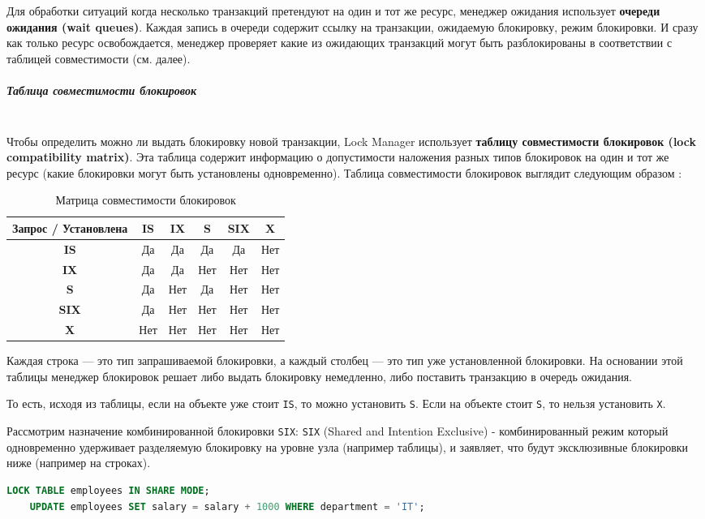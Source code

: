  Для обработки ситуаций когда несколько транзакций претендуют на один и тот же ресурс, менеджер ожидания использует \textbf{очереди ожидания (wait queues)}. Каждая запись в очереди содержит ссылку на транзакции, ожидаемую блокировку, режим блокировки. И сразу как только ресурс освобождается, менеджер проверяет какие из ожидающих транзакций могут быть разблокированы в соответствии с таблицей совместимости (см. далее).

\subparagraph{Таблица совместимости блокировок} ~\\

 Чтобы определить можно ли выдать блокировку новой транзакции, Lock Manager использует \textbf{таблицу совместимости блокировок (lock compatibility matrix)}. Эта таблица содержит информацию о допустимости наложения разных типов блокировок на один и тот же ресурс (какие блокировки могут быть установлены одновременно). Таблица совместимости блокировок выглядит следующим образом \autocite{Silberschatz}:
 
 \begin{table}[H]
    \centering
    \begin{tabular}{|c|c|c|c|c|c|}
        \hline
        \textbf{Запрос / Установлена} & \textbf{IS} & \textbf{IX} & \textbf{S} & \textbf{SIX} & \textbf{X} \\
        \hline
        \textbf{IS} & Да & Да & Да & Да & Нет \\
        \hline
        \textbf{IX} & Да & Да & Нет & Нет & Нет \\
        \hline
        \textbf{S} & Да & Нет & Да & Нет & Нет \\
        \hline
        \textbf{SIX} & Да & Нет & Нет & Нет & Нет \\
        \hline
        \textbf{X} & Нет & Нет & Нет & Нет & Нет \\
        \hline
    \end{tabular}
    \caption{Матрица совместимости блокировок}
 \end{table}

 Каждая строка — это тип запрашиваемой блокировки, а каждый столбец — это тип уже установленной блокировки.
 На основании этой таблицы менеджер блокировок решает либо выдать блокировку немедленно, либо поставить транзакцию в очередь ожидания.
 
 То есть, исходя из таблицы, если на объекте уже стоит \texttt{IS}, то можно установить \texttt{S}. Если на объекте стоит \texttt{S}, то нельзя установить \texttt{X}.

 Рассмотрим назначение комбинированной блокировки \texttt{SIX}:
 \texttt{SIX} (Shared and Intention Exclusive) - комбинированный режим который одновременно удерживает разделяемую блокировку на уровне узла (например таблицы), и заявляет, что будут эксклюзивные блокировки ниже (например на строках).
 \begin{lstlisting}[language=SQL]
    LOCK TABLE employees IN SHARE MODE;
    UPDATE employees SET salary = salary + 1000 WHERE department = 'IT';   
 \end{lstlisting}


